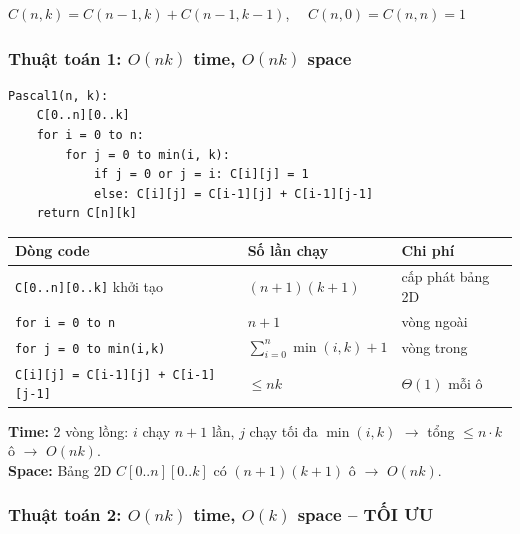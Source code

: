 \documentclass[10pt]{article}
\begin{document}
\(C(n,k) = C(n-1,k) + C(n-1,k-1)\), \(\quad C(n,0) = C(n,n) = 1\)

\subsubsection{\texorpdfstring{Thuật toán 1: \(O(nk)\) time, \(O(nk)\)
space}{Thuật toán 1: O(nk) time, O(nk) space}}\label{thuux1eadt-touxe1n-1-onk-time-onk-space}

\begin{tcolorbox}[colback=gray!8, colframe=gray!50, boxrule=0.5pt, arc=2pt,
  left=6pt, right=6pt, top=4pt, bottom=4pt,
  title={\small\textbf{Pseudocode 17: Pascal Triangle -- DP (O(nk) space)}}]
\begin{verbatim}
Pascal1(n, k):
    C[0..n][0..k]
    for i = 0 to n:
        for j = 0 to min(i, k):
            if j = 0 or j = i: C[i][j] = 1
            else: C[i][j] = C[i-1][j] + C[i-1][j-1]
    return C[n][k]
\end{verbatim}
\end{tcolorbox}

\begin{tcolorbox}[colback=yellow!5, colframe=orange!50, boxrule=0.5pt, arc=2pt, title={\small\textbf{Phân tích Complexity -- Pascal Triangle DP ($O(nk)$ space)}}]
\begin{tabular}{|l|l|l|}
\hline
\textbf{Dòng code} & \textbf{Số lần chạy} & \textbf{Chi phí} \\
\hline
\texttt{C[0..n][0..k]} khởi tạo & $(n+1)(k+1)$ & cấp phát bảng 2D \\
\hline
\texttt{for i = 0 to n} & $n+1$ & vòng ngoài \\
\hline
\quad \texttt{for j = 0 to min(i,k)} & $\sum_{i=0}^{n}\min(i,k)+1$ & vòng trong \\
\hline
\quad\quad \texttt{C[i][j] = C[i-1][j] + C[i-1][j-1]} & $\leq nk$ & $\Theta(1)$ mỗi ô \\
\hline
\end{tabular}
\vspace{0.2cm}

\textbf{Time:} 2 vòng lồng: $i$ chạy $n+1$ lần, $j$ chạy tối đa $\min(i,k)$ $\to$ tổng $\leq n \cdot k$ ô $\to$ $O(nk)$.\\
\textbf{Space:} Bảng 2D $C[0..n][0..k]$ có $(n+1)(k+1)$ ô $\to$ $O(nk)$.
\end{tcolorbox}

\subsubsection{\texorpdfstring{Thuật toán 2: \(O(nk)\) time, \(O(k)\)
space -- TỐI
ƯU}{Thuật toán 2: O(nk) time, O(k) space -- TỐI ƯU}}\label{thuux1eadt-touxe1n-2-onk-time-ok-space-tux1ed1i-ux1b0u}
\end{document}
